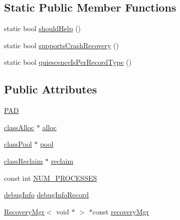 \subsection*{Static Public Member Functions}
\begin{DoxyCompactItemize}
\item 
static bool \hyperlink{classrecord__manager__single__type_aba373074564801edaa50df79b405f0e9}{should\+Help} ()
\item 
static bool \hyperlink{classrecord__manager__single__type_a58d8ea1365033ef1f74b9b6956f534b3}{supports\+Crash\+Recovery} ()
\item 
static bool \hyperlink{classrecord__manager__single__type_a903370ed47527b3f97428a1f3d0b535e}{quiescence\+Is\+Per\+Record\+Type} ()
\end{DoxyCompactItemize}
\subsection*{Public Attributes}
\begin{DoxyCompactItemize}
\item 
\hyperlink{classrecord__manager__single__type_aa8000dd2cb059f78ca77ccef6800166d}{P\+AD}
\item 
\hyperlink{classrecord__manager__single__type_a5cdd0ef714fadb6eb7818aaf69918625}{class\+Alloc} $\ast$ \hyperlink{classrecord__manager__single__type_a7cb764de72e8a8973ca3234f4fc96d0f}{alloc}
\item 
\hyperlink{classrecord__manager__single__type_a2a7217967912e867c7ab6e4a7f3deeb5}{class\+Pool} $\ast$ \hyperlink{classrecord__manager__single__type_a396149240bef252c12fe9f6418e7594d}{pool}
\item 
\hyperlink{classrecord__manager__single__type_a831ae4c91e0ba85f07fd6b68ef18f035}{class\+Reclaim} $\ast$ \hyperlink{classrecord__manager__single__type_ad79e8a67f4a66c8d7ed83764aaade7d9}{reclaim}
\item 
const int \hyperlink{classrecord__manager__single__type_a2ddbaa967eccb64c5d621675fa732b1f}{N\+U\+M\+\_\+\+P\+R\+O\+C\+E\+S\+S\+ES}
\item 
\hyperlink{classdebugInfo}{debug\+Info} \hyperlink{classrecord__manager__single__type_ac0778b69c82a9609260a1048659829b9}{debug\+Info\+Record}
\item 
\hyperlink{classRecoveryMgr}{Recovery\+Mgr}$<$ void $\ast$ $>$ $\ast$const \hyperlink{classrecord__manager__single__type_aac9343d6515d6d32a71f541aeb098376}{recovery\+Mgr}
\end{DoxyCompactItemize}

